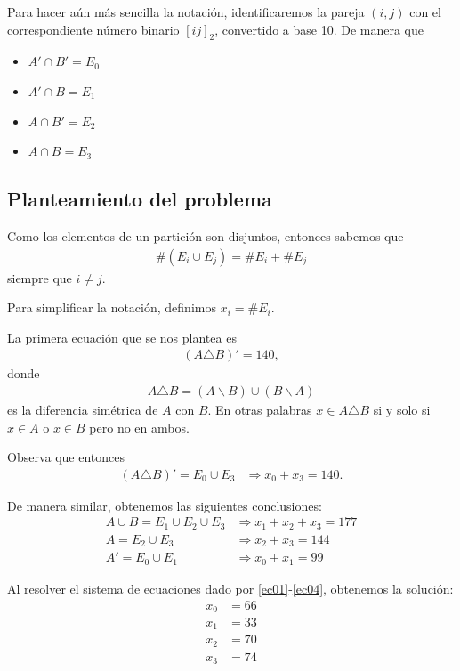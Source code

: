 Para hacer aún más sencilla la notación, identificaremos la pareja $ (i,j) $ con el correspondiente número binario $ [ij]_{2} $, convertido a base 10. De manera que 
\begin{itemize}
	\item $ A' \cap B' = E_{0}$
	\item $ A'  \cap B = E_{1}$
	\item $ A \cap B'  = E_{2}$
	\item $ A  \cap B  = E_{3}$
\end{itemize}

\subsection{Planteamiento del problema}

Como los elementos de un partición son disjuntos, entonces sabemos que 
\begin{align*}
	\#\left(E_i\cup E_j\right) = \#E_i+\#E_j
\end{align*}
siempre que $ i\neq j $.

Para simplificar la notación, definimos $ x_i=\# E_i. $

La primera ecuación que se nos plantea es
\begin{align*}
	\left(A \triangle B \right)'=140,
\end{align*}
donde 
\begin{align*}
	A\triangle B = (A\backslash B)\cup(B\backslash A)
\end{align*}
es la diferencia simétrica de $ A $ con $ B $. En otras palabras $ x\in A \triangle B $ si y solo si $ x\in A $ o $ x \in B $ pero no en ambos.

Observa que entonces
\begin{align}
	\label{ec01}
	\left(A\triangle B\right)' = E_0 \cup E_3 &
	\Rightarrow
	x_0 + x_3 = 140.
\end{align}

De manera similar, obtenemos las siguientes conclusiones:
\begin{align}
	\label{ec02}
	A\cup B = E_1\cup E_2 \cup E_3 &
	\Rightarrow x_1+x_2+x_3=177 \\
	\label{ec03}
	A = E_2 \cup E_3 &
	\Rightarrow x_2+x_3 = 144 \\
	\label{ec04}
	A' = E_0 \cup E_1 &
	\Rightarrow x_0+x_1 =99
\end{align}

Al resolver el sistema de ecuaciones dado por  \ref{ec01}-\ref{ec04}, obtenemos la solución:
\begin{align*}
	x_0 &= 66 \\
	x_1 &= 33 \\
	x_2 &= 70 \\
	x_3 &= 74
\end{align*}

